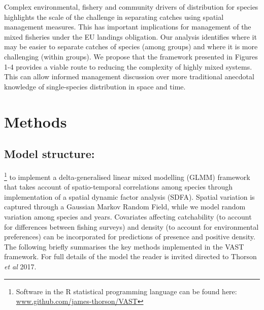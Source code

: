 \documentclass{nature}
\begin{document}


Complex environmental, fishery and community drivers of distribution for
 species highlights the scale of the challenge
in separating catches  using
spatial management measures. This has important implications for management of
the mixed fisheries under the EU landings obligation. Our analysis identifies
where it may be easier to separate catches of species (among groups) and where
it is more challenging (within groups). We propose that the framework presented
in Figures 1-4 provides a viable route to reducing the complexity of highly
mixed systems.  This can allow informed management discussion over more
traditional anecdotal knowledge of single-species distribution in space and
time.


\section*{Methods}

\subsection{Model structure:} 
 \footnote{Software in the R statistical programming language can be found
	here: \url{www.github.com/james-thorson/VAST}} to implement a
delta-generalised linear mixed modelling (GLMM) framework that takes account of
spatio-temporal correlations among species through implementation of a
spatial dynamic factor analysis (SDFA). Spatial variation is captured through a
Gaussian Markov Random Field, while we model random variation among
species and years. Covariates affecting catchability (to account for
differences between fishing surveys) and density (to account for environmental
preferences) can be incorporated for predictions of presence and positive
density. The following briefly summarises the key methods implemented in the
VAST framework. For full details of the model the reader is invited directed to
Thorson \textit{et al} 2017\cite{Thorson2017}.
\end{document}
